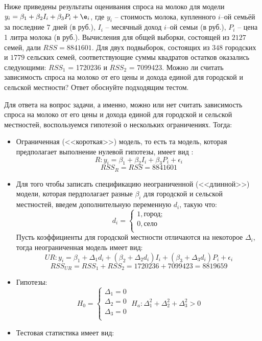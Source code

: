 \documentclass[pdftex,11pt,openany]{book}\usepackage[]{graphicx}\usepackage[]{color}
\begin{document}
\begin{problem}  %
 Ниже приведены результаты оценивания спроса на молоко для модели $y_i=\beta_1 + \beta_2 I_i + \beta_3 P_i + \e_i$, где $y_i$ -- стоимость молока, купленного $i$--ой семьёй за последние $7$ дней (в руб.), $I_i$ -- месячный доход $i$--ой семьи (в руб.), $P_i$ -- цена 1 литра молока (в руб.). Вычисления для общей выборки, состоящей из $2127$ семей, дали $RSS = 8841601$. Для двух подвыборок, состоящих из $348$ городских и $1779$ сельских семей, соответствующие суммы квадратов остатков оказались следующими: $RSS_1$ = 1720236 и $RSS_2$ = 7099423. Можно ли считать зависимость спроса на молоко от его цены и дохода единой для городской и сельской местности? Ответ обоснуйте подходящим тестом.
\end{problem}

\begin{solution}
Для ответа на вопрос задачи, а именно, можно или нет считать зависимость спроса на молоко от его цены и дохода единой для городской и сельской местностей, воспользуемся гипотезой о нескольких ограничениях. Тогда:
\begin{itemize}
\item Ограниченная (<<короткая>>) модель, то есть та модель, которая предполагает выполнение нулевой гипотезы, имеет вид :
\[
R: y_i = \beta_1 + \beta_2I_i + \beta_3P_i + \epsilon_i
\]
\[
RSS_R = RSS = 8841601
\]
\item Для того чтобы записать спецификацию неограниченной (<<длинной>>) модели, которая пердполагает разные $\beta_i$ для городской и сельской местностей, введем дополнительную переменную $d_i$, такую что:
\[
d_i=
\begin{cases}
1, \text{город;}\\
0, \text{село}\\
\end{cases}
\]
Пусть коэффициенты для городской местности отличаются на некоторое $\Delta_i$, тогда неограниченная модель имеет вид:
\[
UR: y_i = \beta_1+\Delta_1 d_i + (\beta_2+\Delta_2 d_i)I_i + (\beta_3+\Delta_3 d_i)P_i + \epsilon_i
\]
\[
RSS_{UR} = RSS_1 + RSS_2 = 1720236 + 7099423 = 8819659
\]
\item Гипотезы:
\[
H_0=
\begin{cases}
\Delta_1=0\\
\Delta_2=0\\
\Delta_3=0\\
\end{cases} \;
H_a:\Delta_1^2+\Delta_2^2+\Delta_3^2>0 
\]
\item Тестовая статистика имеет вид:

\end{itemize}
\end{solution}
\end{document}
